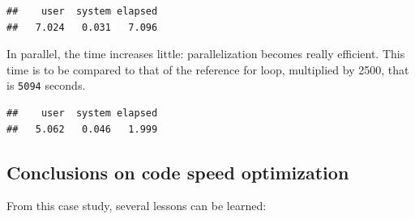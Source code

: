 \documentclass[
  12pt,
  american,
  a4paper,
  extrafontsizes,onecolumn,openright
  ]{memoir}
\newenvironment{Shaded}{\begin{snugshade}}{\end{snugshade}}
\newcommand{\DecValTok}[1]{\textcolor[rgb]{0.00,0.00,0.81}{#1}}
\newcommand{\FunctionTok}[1]{\textcolor[rgb]{0.00,0.00,0.00}{#1}}
\newcommand{\NormalTok}[1]{#1}
\newcommand{\OtherTok}[1]{\textcolor[rgb]{0.56,0.35,0.01}{#1}}
\newcommand{\SpecialCharTok}[1]{\textcolor[rgb]{0.00,0.00,0.00}{#1}}
\begin{document}
\scriptsize

\begin{Shaded}
\end{Shaded}

\begin{verbatim}
##    user  system elapsed 
##   7.024   0.031   7.096
\end{verbatim}

\normalsize

In parallel, the time increases little: parallelization becomes really efficient.
This time is to be compared to that of the reference for loop, multiplied by 2500, that is \texttt{5094} seconds.

\scriptsize

\begin{Shaded}
\end{Shaded}

\begin{verbatim}
##    user  system elapsed 
##   5.062   0.046   1.999
\end{verbatim}

\normalsize

\hypertarget{conclusions-on-code-speed-optimization}{%
\subsection{Conclusions on code speed optimization}\label{conclusions-on-code-speed-optimization}}

From this case study, several lessons can be learned:
\end{document}
